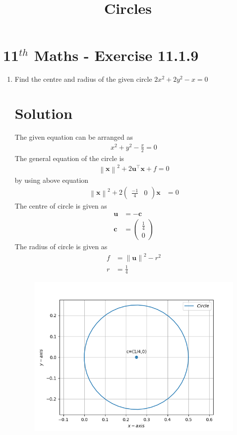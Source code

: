 \documentclass[12pt]{article}
\providecommand{\norm}[1]{\left\lVert#1\right\rVert}
\newcommand{\myvec}[1]{\ensuremath{\begin{pmatrix}#1\end{pmatrix}}}
\let\vec\mathbf
\begin{document}
\begin{center}
\title{\textbf{Circles}}
\date{\vspace{-5ex}} %
\maketitle
\end{center}
\setcounter{page}{1}
\section{11$^{th}$ Maths - Exercise 11.1.9}

\begin{enumerate}
\item Find the centre and radius of the given circle $2x^2+2y^2-x=0$
\section{Solution}

The given equation can be arranged as 
\begin{align}
x^2+y^2-\frac{x}{2}=0
\end{align}
The general equation of the circle is 
\begin{align}
\norm{\vec{x}}^{2} + 2\vec{u}^{\top}\vec{x} + f = 0
\end{align}
by using above equation
\begin{align}
	\norm{\vec{x}}^2+2\myvec{\frac{-1}{4} & 0}\vec{x}&=0
\end{align}	
The centre of circle is given as
\begin{align}
	\vec{u} &= -\vec{c} \\
\vec{c}&=\myvec{\frac{1}{4}\\0}
\end{align}
The radius of circle is given as
\begin{align}
f&=\norm{\vec{u}}^2 -r^2\\
r&=\frac{1}{4}
\end{align}
\begin{figure}[h]
\includegraphics[width=\columnwidth]{figs/fig.png}
\caption{}
  \label{fig:Figure}
\end{figure}
\end{enumerate}
\end{document}
